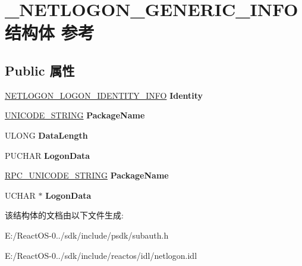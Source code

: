 \hypertarget{struct___n_e_t_l_o_g_o_n___g_e_n_e_r_i_c___i_n_f_o}{}\section{\+\_\+\+N\+E\+T\+L\+O\+G\+O\+N\+\_\+\+G\+E\+N\+E\+R\+I\+C\+\_\+\+I\+N\+F\+O结构体 参考}
\label{struct___n_e_t_l_o_g_o_n___g_e_n_e_r_i_c___i_n_f_o}
\subsection*{Public 属性}
\begin{DoxyCompactItemize}
\item 
\mbox{\label{struct___n_e_t_l_o_g_o_n___g_e_n_e_r_i_c___i_n_f_o_adab816e22b46669505128bff0c9ed45d}} 
\hyperlink{struct___n_e_t_l_o_g_o_n___l_o_g_o_n___i_d_e_n_t_i_t_y___i_n_f_o}{N\+E\+T\+L\+O\+G\+O\+N\+\_\+\+L\+O\+G\+O\+N\+\_\+\+I\+D\+E\+N\+T\+I\+T\+Y\+\_\+\+I\+N\+FO} {\bfseries Identity}
\item 
\mbox{\label{struct___n_e_t_l_o_g_o_n___g_e_n_e_r_i_c___i_n_f_o_a1356620313f2b3e48809dc4a3c64982f}} 
\hyperlink{struct___u_n_i_c_o_d_e___s_t_r_i_n_g}{U\+N\+I\+C\+O\+D\+E\+\_\+\+S\+T\+R\+I\+NG} {\bfseries Package\+Name}
\item 
\mbox{\label{struct___n_e_t_l_o_g_o_n___g_e_n_e_r_i_c___i_n_f_o_a5acb3e2b3bbb52080c75c53df48ba4e3}} 
U\+L\+O\+NG {\bfseries Data\+Length}
\item 
\mbox{\label{struct___n_e_t_l_o_g_o_n___g_e_n_e_r_i_c___i_n_f_o_abf162e0704a92b8e7a3e0de42f2027fb}} 
P\+U\+C\+H\+AR {\bfseries Logon\+Data}
\item 
\mbox{\label{struct___n_e_t_l_o_g_o_n___g_e_n_e_r_i_c___i_n_f_o_aa6d287b7c5a4f33d42e5fbdac82e96ed}} 
\hyperlink{struct___r_p_c___u_n_i_c_o_d_e___s_t_r_i_n_g}{R\+P\+C\+\_\+\+U\+N\+I\+C\+O\+D\+E\+\_\+\+S\+T\+R\+I\+NG} {\bfseries Package\+Name}
\item 
\mbox{\label{struct___n_e_t_l_o_g_o_n___g_e_n_e_r_i_c___i_n_f_o_a4fc234c01b6be17a1d576170de8dbd09}} 
U\+C\+H\+AR $\ast$ {\bfseries Logon\+Data}
\end{DoxyCompactItemize}


该结构体的文档由以下文件生成\+:\begin{DoxyCompactItemize}
\item 
E\+:/\+React\+O\+S-\/0../sdk/include/psdk/subauth.\+h\item 
E\+:/\+React\+O\+S-\/0../sdk/include/reactos/idl/netlogon.\+idl\end{DoxyCompactItemize}
